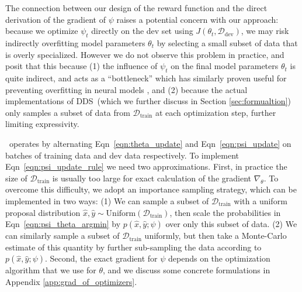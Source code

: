 The connection between our design of the reward function and the direct derivation of the gradient of $\psi$ raises a potential concern with our approach: because we optimize $\psi_t$ directly on the dev set using $J(\theta_t, \mathcal{D}_\text{dev})$, we may risk indirectly overfitting model parameters $\theta_t$ by selecting a small subset of data that is overly specialized.
However we do not observe this problem in practice, and posit that this because (1) the influence of $\psi_t$ on the final model parameters $\theta_t$ is quite indirect, and acts as a ``bottleneck'' which has similarly proven useful for preventing overfitting in neural models \cite{grezl2007probabilistic}, and (2) because the actual implementations of DDS~(which we further discuss in Section \ref{sec:formualtion}) only samples a subset of data from $\mathcal{D}_\text{train}$ at each optimization step, further limiting expressivity.


\dds~operates by alternating Eqn~\ref{eqn:theta_update} and Eqn~\ref{eqn:psi_update} on batches of training data and dev data respectively. To implement Eqn~\ref{eqn:psi_update_rule} we need two approximations.
First, in practice the size of $\mathcal{D}_\text{train}$ is usually too large for exact calculation of the gradient $\nabla_\theta$. To overcome this difficulty, we adopt an importance sampling strategy, which can be implemented in two ways:
(1) We can sample a subset of $\mathcal{D}_{\text{train}}$ with a uniform proposal distribution $\hat{x}, \hat{y} \sim \text{Uniform}(\mathcal{D}_\text{train})$, then scale the probabilities in Eqn~\ref{eqn:psi_theta_argmin} by $p(\hat{x}, \hat{y}; \psi)$ over only this subset of data.
(2) We can similarly sample a subset of $\mathcal{D}_{\text{train}}$ uniformly, but then take a Monte-Carlo estimate of this quantity by further sub-sampling the data according to $p(\hat{x}, \hat{y}; \psi)$.
Second, the exact gradient for $\psi$ depends on the optimization algorithm that we use for $\theta$, and we discuss some concrete formulations in Appendix \ref{app:grad_of_optimizers}.